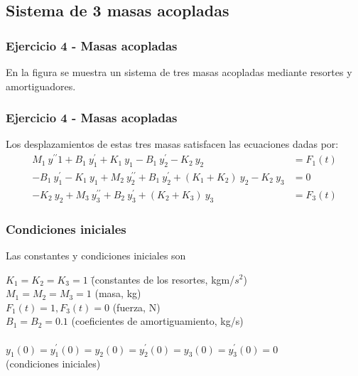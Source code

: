 \subsection{Sistema de 3 masas acopladas}
\begin{frame}[fragile]
\frametitle{Ejercicio 4 - Masas acopladas}
En la figura se muestra un sistema de tres masas acopladas mediante resortes y amortiguadores.
\begin{figure}
    \centering
    
\end{figure}
\end{frame}
\begin{frame}[fragile]
\frametitle{Ejercicio 4 - Masas acopladas}
Los desplazamientos de estas tres masas satisfacen las ecuaciones dadas por:
\fontsize{12}{12}\selectfont
\begin{align*} 
    M_{1} \: y^{\prime \prime}{1} + B_{1} \: y^{\prime}_{1} + K_{1} \: y_{1} - B_{1} \: y^{\prime}_{2} - K_{2} \: y_{2} & = F_{1}(t) \\
    -B_{1} \: y^{\prime}_{1} - K_{1} \: y_{1} + M_{2} \:  y^{\prime \prime}_{2} + B_{1} \: y^{\prime}_{2} + (K_{1} + K_{2}) \: y_{2} - K_{2} \: y_{3} & = 0 \\
    - K_{2} \: y_{2} + M_{3} \: y^{\prime \prime}_{3} + B_{2} \: y^{\prime}_{3} + (K_{2} + K_{3})  \: y_{3} & =  F_{3}(t) 
\end{align*}
\begin{figure}
    \centering
    
\end{figure}
\end{frame}
\begin{frame}
\frametitle{Condiciones iniciales}
Las constantes y condiciones iniciales son
\fontsize{12}{12}\selectfont
\begin{tabbing}
$K_{1} = K_{2} = K_{3} = 1$ \hspace{1.2cm} \= (constantes de los resortes, kgm/$s^{2}$) \\
$M_{1} = M_{2} = M_{3} = 1$ \> (masa, kg) \\
$F_{1}(t) = 1, F_{3}(t) = 0$ \> (fuerza, N) \\
$B_{1} = B_{2} =0.1$ \> (coeficientes de amortiguamiento, kg/s) \\
\\
$y_{1}(0) = y^{\prime}_{1}(0) = y_{2}(0) = y^{\prime}_{2}(0) = y_{3}(0) = y^{\prime}_{3}(0) = 0$ \\
\> (condiciones iniciales)
\end{tabbing}
\end{frame}
